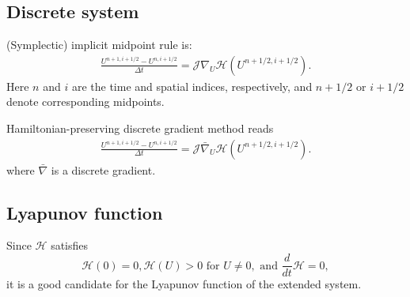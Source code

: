 \documentclass[12pt,a4paper,draft]{article}
\newcommand{\dt}{\Delta t}
\begin{document}
\subsection{Discrete system}
(Symplectic) implicit midpoint rule is:
\begin{align}
\frac{U^{n+1,i+1/2} - U^{n,i+1/2}}{\dt} = \mathcal{J} \nabla_U \mathcal{H}(U^{n+1/2,i+1/2}).
\end{align}
Here $n$ and $i$ are the time and spatial indices, respectively, and $n+1/2$ or $i+1/2$ denote corresponding midpoints.

Hamiltonian-preserving discrete gradient method reads
\begin{align}
\frac{U^{n+1,i+1/2} - U^{n,i+1/2}}{\dt} = \mathcal{J} \bar{\nabla}_U \mathcal{H}(U^{n+1/2,i+1/2}).
\end{align}
where $\bar{\nabla}$ is a discrete gradient.

\subsection{Lyapunov function}
Since $\mathcal{H}$ satisfies 
$$\mathcal{H}(0) = 0, \mathcal{H}(U) > 0 \text{ for } U \neq 0, \text{ and } \frac{d}{dt}\mathcal{H} =0,$$
it is a good candidate for the Lyapunov function of the extended system.
\end{document}
